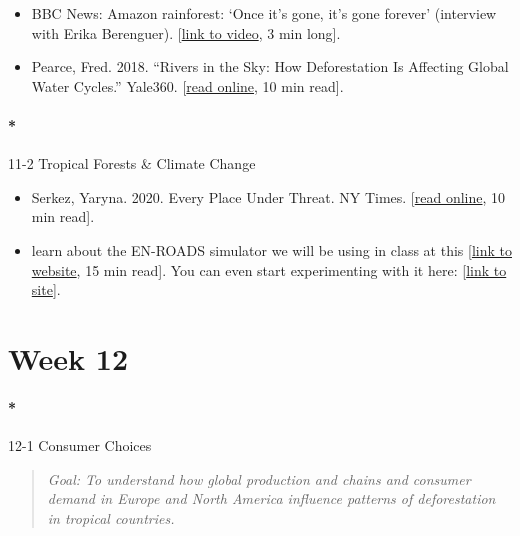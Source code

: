 \documentclass[
  10pt,
  letterpaper,
  oneside,
  open=any]{scrbook}
\let\oldparagraph\paragraph
\renewcommand{\paragraph}[1]{\oldparagraph{#1}\mbox{}}
\begin{document}
\begin{itemize}
\item
  BBC News: Amazon rainforest: `Once it's gone, it's gone forever'
  (interview with Erika Berenguer).
  {[}\href{https://www.youtube.com/watch?v=TigV80hwebg}{link to video},
  3 min long{]}.
\item
  Pearce, Fred. 2018. ``Rivers in the Sky: How Deforestation Is
  Affecting Global Water Cycles.'' Yale360.
  {[}\href{https://e360.yale.edu/features/how-deforestation-affecting-global-water-cycles-climate-change}{read
  online}, 10 min read{]}.
\end{itemize}

\paragraph*{11-2 Tropical Forests \& Climate
Change}\label{tropical-forests-climate-change}

\begin{itemize}
\item
  Serkez, Yaryna. 2020. Every Place Under Threat. NY Times.
  {[}\href{https://www.nytimes.com/interactive/2020/10/02/opinion/amazon-under-threat.html}{read
  online}, 10 min read{]}.
\item
  learn about the EN-ROADS simulator we will be using in class at this
  {[}\href{https://www.climateinteractive.org/en-roads/}{link to
  website}, 15 min read{]}. You can even start experimenting with it
  here:
  {[}\href{https://en-roads.climateinteractive.org/scenario.html?v=22.8.0}{link
  to site}{]}.
\end{itemize}

\section*{Week 12}\label{week-12}


\paragraph*{12-1 Consumer Choices}\label{consumer-choices}

\begin{quote}
\emph{Goal: To understand how global production and chains and consumer
demand in Europe and North America influence patterns of deforestation
in tropical countries.}
\end{quote}
\end{document}
